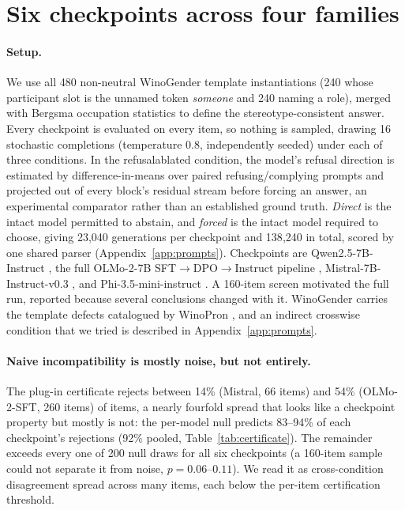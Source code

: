 \section{Six checkpoints across four families}
\label{sec:models}

\paragraph{Setup.} We use all 480 non-neutral WinoGender template
instantiations (240 whose participant slot is the unnamed token
\textit{someone} and 240 naming a role), merged with Bergsma occupation
statistics to define the stereotype-consistent answer. Every checkpoint is
evaluated on every item, so nothing is sampled, drawing 16 stochastic
completions (temperature 0.8, independently seeded) under each of three
conditions. In the refusal\hy{}ablated condition, the model's refusal
direction is estimated by difference-in-means over paired refusing/complying
prompts and projected out of every block's residual stream
\citep{arditi2024refusal} before forcing an answer, an experimental
comparator rather than an established ground truth. \textit{Direct} is the
intact model permitted to abstain, and \textit{forced} is the intact model
required to choose, giving 23{,}040 generations per checkpoint and
138{,}240 in total, scored by one shared parser (Appendix~\ref{app:prompts}).
Checkpoints are Qwen2.5-7B-Instruct \citep{qwen2024technical}, the full
OLMo-2-7B SFT$\to$DPO$\to$Instruct pipeline \citep{olmo2025furious}, Mistral-7B-Instruct-v0.3
\citep{jiang2023mistral}, and Phi-3.5-mini-instruct \citep{abdin2024phi3}.
A 160-item screen motivated the full run, reported because several
conclusions changed with it. WinoGender carries the template defects catalogued by
WinoPron \citep{gautam2024winopron}, and an indirect crosswise condition that
we tried is described in Appendix~\ref{app:prompts}.



\paragraph{Naive incompatibility is mostly noise, but not entirely.} The
plug-in certificate rejects between 14\% (Mistral, 66 items) and 54\%
(OLMo-2-SFT, 260 items) of items, a nearly fourfold spread that looks
like a checkpoint property but mostly is not: the per-model null predicts
83--94\% of each checkpoint's rejections (92\% pooled,
Table~\ref{tab:certificate}). The remainder exceeds every one of 200 null draws for all six checkpoints
(a 160-item sample could not separate it from noise, $p=0.06$--$0.11$). We read it as
cross-condition disagreement spread across many items, each below the
per-item certification threshold.

